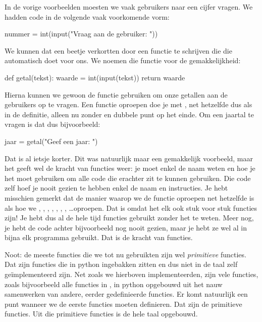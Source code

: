   In de vorige voorbeelden moesten we vaak gebruikers naar een cijfer vragen.
  We hadden code in de volgende vaak voorkomende vorm:
  \begin{python}
    nummer = int(input("Vraag aan de gebruiker: "))
  \end{python}
  We kunnen dat een beetje verkortten door een functie te schrijven die die
   automatisch doet voor ons. We noemen die functie
   voor de gemakkelijkheid:
  \begin{python}
    def getal(tekst):
      waarde = int(input(tekst))
      return waarde
  \end{python}
  Hierna kunnen we gewoon de functie  gebruiken om onze getallen aan
  de gebruikers op te vragen. Een functie oproepen doe je met
  , net hetzelfde dus als in de definitie,
  alleen nu zonder  en dubbele punt op het einde. Om een jaartal te
  vragen is dat dus bijvoorbeeld:
  \begin{python}
    jaar = getal("Geef een jaar: ")
  \end{python}
  Dat is al ietsje korter. Dit was natuurlijk maar een gemakkelijk voorbeeld,
  maar het geeft wel de kracht van functies weer: je moet enkel de naam weten en
  hoe je het moet gebruiken om alle code die erachter zit te kunnen gebruiken.
  Die code zelf hoef je nooit gezien te hebben enkel de naam en instructies. Je
  hebt misschien gemerkt dat de manier waarop we de functie  oproepen
  net hetzelfde is als hoe we , , , ,
  , , , \ldots oproepen. Dat is omdat het elk ook
  stuk voor stuk functies zijn! Je hebt dus al de hele tijd functies gebruikt
  zonder het te weten. Meer nog, je hebt de code achter bijvoorbeeld 
  nog nooit gezien, maar je hebt ze wel al in bijna elk programma gebruikt. Dat
  is de kracht van functies.

  Noot: de meeste functies die we tot nu gebruikten zijn wel \emph{primitieve}
  functies. Dat zijn functies die in python ingebakken zitten en dus niet in de
  taal zelf ge\"implementeerd zijn.
  Net zoals we hierboven  implementeerden, zijn vele
  functies, zoals bijvoorbeeld alle functies in , in python opgebouwd
  uit het nauw samenwerken van andere, eerder gedefinieerde functies. Er komt
  natuurlijk een punt wanneer we de eerste functies moeten definieren. Dat zijn
  de primitieve functies. Uit die primitieve functies is de hele taal opgebouwd.

